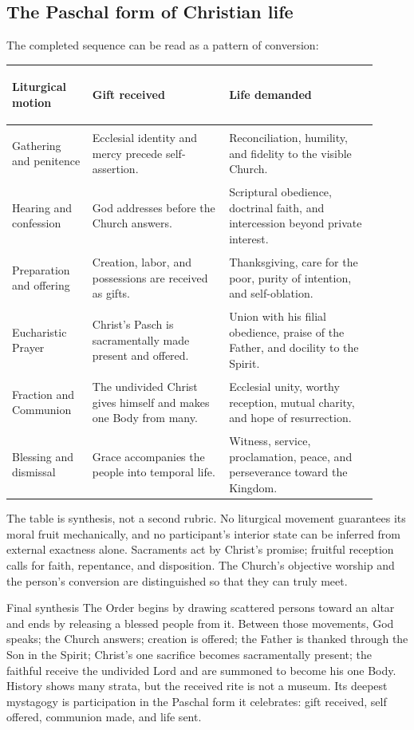 \subsection{The Paschal form of Christian life}

The completed sequence can be read as a pattern of conversion:

\begin{longtable}{>{\bfseries\raggedright\arraybackslash}p{0.20\linewidth}>{\raggedright\arraybackslash}p{0.34\linewidth}>{\raggedright\arraybackslash}p{0.37\linewidth}}
Liturgical motion & Gift received & Life demanded\\
\midrule
Gathering and penitence & Ecclesial identity and mercy precede self-assertion. & Reconciliation, humility, and fidelity to the visible Church.\\
Hearing and confession & God addresses before the Church answers. & Scriptural obedience, doctrinal faith, and intercession beyond private interest.\\
Preparation and offering & Creation, labor, and possessions are received as gifts. & Thanksgiving, care for the poor, purity of intention, and self-oblation.\\
Eucharistic Prayer & Christ's Pasch is sacramentally made present and offered. & Union with his filial obedience, praise of the Father, and docility to the Spirit.\\
Fraction and Communion & The undivided Christ gives himself and makes one Body from many. & Ecclesial unity, worthy reception, mutual charity, and hope of resurrection.\\
Blessing and dismissal & Grace accompanies the people into temporal life. & Witness, service, proclamation, peace, and perseverance toward the Kingdom.\\
\end{longtable}

The table is synthesis, not a second rubric. No liturgical movement guarantees its moral fruit mechanically, and no participant's interior state can be inferred from external exactness alone. Sacraments act by Christ's promise; fruitful reception calls for faith, repentance, and disposition. The Church's objective worship and the person's conversion are distinguished so that they can truly meet.

\begin{massbox}{Final synthesis}
The Order begins by drawing scattered persons toward an altar and ends by releasing a blessed people from it. Between those movements, God speaks; the Church answers; creation is offered; the Father is thanked through the Son in the Spirit; Christ's one sacrifice becomes sacramentally present; the faithful receive the undivided Lord and are summoned to become his one Body. History shows many strata, but the received rite is not a museum. Its deepest mystagogy is participation in the Paschal form it celebrates: gift received, self offered, communion made, and life sent.
\end{massbox}
